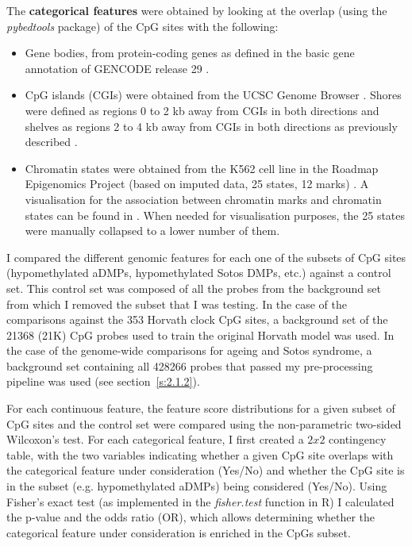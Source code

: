 The \textbf{categorical features} were obtained by looking at the overlap (using the \textit{pybedtools} package) \cite{Quinlan2011} of the CpG sites with the following:

\begin{itemize}
	
	\item Gene bodies, from protein-coding genes as defined in the basic gene annotation of GENCODE release 29 \cite{Frankish2018}.
	
	\item CpG islands (\acrshort{CGI}s) were obtained from the UCSC Genome Browser \cite{Bock2007}. Shores were defined as regions 0 to 2 kb away from CGIs in both directions and shelves as regions 2 to 4 kb away from CGIs in both directions as previously described \cite{Zhang2015,Martin-Herranz2017a}.
	
	\item Chromatin states were obtained from the K562 cell line in the Roadmap Epigenomics Project (based on imputed data, 25 states, 12 marks) \cite{Consortium}. A visualisation for the association between chromatin marks and chromatin states can be found in \cite{Consortiuma}. When needed for visualisation purposes, the 25 states were manually collapsed to a lower number of them.
	
\end{itemize}

I compared the different genomic features for each one of the subsets of CpG sites (hypomethylated aDMPs, hypomethylated Sotos DMPs, etc.) against a control set. This control set was composed of all the probes from the background set from which I removed the subset that I was testing. In the case of the comparisons against the 353 Horvath clock CpG sites, a background set of the 21368 (21K) CpG probes used to train the original Horvath model \cite{Horvath2013} was used. In the case of the genome-wide comparisons for ageing and Sotos syndrome, a background set containing all 428266 probes that passed my pre-processing pipeline was used (see section~\ref{s:2.1.2}).

\bigskip

For each continuous feature, the feature score distributions for a given subset of CpG sites and the control set were compared using the non-parametric two-sided Wilcoxon's test. For each categorical feature, I first created a $2x2$ contingency table, with the two variables indicating whether a given CpG site overlaps with the categorical feature under consideration (Yes/No) and whether the CpG site is in the subset (e.g. hypomethylated aDMPs) being considered (Yes/No). Using Fisher's exact test (as implemented in the \textit{fisher.test} function in R) I calculated the p-value and the odds ratio (\acrshort{OR}), which allows determining whether the categorical feature under consideration is enriched in the CpGs subset. 

